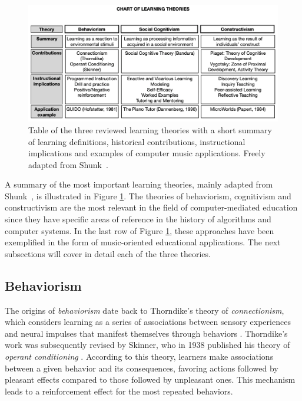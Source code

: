 \documentclass[journal]{IEEEtran}
\begin{document}
\begin{figure}[t]
	\centering
	\includegraphics[width=\columnwidth]{images/LT_CHART.png}
	\caption{Table of the three reviewed learning theories with a short summary of learning definitions, historical contributions, instructional implications and examples of computer music applications. Freely adapted from Shunk~\cite{dale1991learning}.}
	\label{fig:LT}       
\end{figure}

A summary of the most important learning theories, mainly adapted from Shunk~\cite{dale1991learning}, is illustrated in Figure \ref{fig:LT}. The theories of behaviorism, cognitivism and constructivism are the most relevant in the field of computer-mediated education since they have specific areas of reference in the history of algorithms and computer systems. In the last row of Figure \ref{fig:LT}, these approaches have been exemplified in the form of music-oriented educational applications. The next subsections will cover in detail each of the three theories.

\subsection{Behaviorism}
\label{subsec:beh}
The origins of \textit{behaviorism} date back to Thorndike's theory of \textit{connectionism}, which considers learning as a series of associations between sensory experiences and neural impulses that manifest themselves through behaviors \cite{thorndike1913}. Thorndike's work was subsequently revised by Skinner, who in 1938 published his theory of \textit{operant conditioning} \cite{skinner1990behavior}. According to this theory, learners make associations between a given behavior and its consequences, favoring actions followed by pleasant effects compared to those followed by unpleasant ones. This mechanism leads to a reinforcement effect for the most repeated behaviors. 
\end{document}
